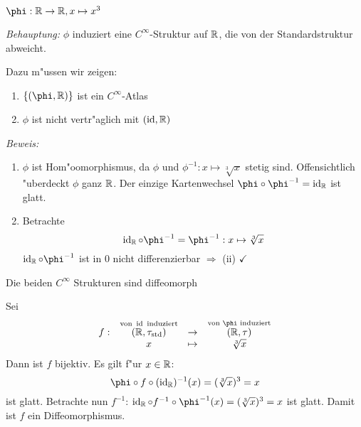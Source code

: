 \begin{Loes}
$\phi: \R \to \R, x \mapsto x^3$

\emph{Behauptung:} $\phi$ induziert eine $C^\infty$-Struktur auf $\operatorname{\mathbb{R}}$, die von der Standardstruktur abweicht.

Dazu m"ussen wir zeigen:\begin{enumerate}[font=\normalfont,label=(\roman*)]
\item
	$\{(\phi, \R)\}$ ist ein $C^\infty$-Atlas
\item
	$\phi$ ist nicht vertr"aglich mit $(\operatorname{id}, \operatorname{\mathbb{R}})$
\end{enumerate}
\emph{Beweis:}\begin{enumerate}[leftmargin=*,widest=ii,font=\normalfont,label=(\roman*)]
\item
	$\phi$ ist Hom"oomorphismus, da $\phi$ und $\phi^{-1}: x \mapsto \sqrt[3]{x}$ stetig sind. Offensichtlich "uberdeckt $\phi$ ganz $\operatorname{\mathbb{R}}$. Der einzige Kartenwechsel $\phi \circ \phi^{-1} = \Id_{\R}$ ist glatt.
\item
	Betrachte
		\[ \Id_{\R} \circ \phi^{-1} = \phi^{-1}: x \mapsto \sqrt[3]{x} \]
	$\Id_{\R} \circ \phi^{-1}$ ist in $0$ nicht differenzierbar $\Rightarrow$ (ii) $\checkmark$
\end{enumerate}
\begin{description}[font=\normalfont\itshape]
\item[Behauptung:]
	Die beiden $C^\infty$ Strukturen sind diffeomorph
\item[Beweis:]
	Sei
		\[\begin{array}{cccc} f:&  \overset{\text{von } \Id \text{ induziert}}{(\R, \tau_{\text{std}})} &\to& \overset{\text{von } \phi \text{ induziert}}{(\R, \tau)} \\
			& x &\mapsto& \sqrt[3]{x} \end{array}\]
	Dann ist $f$ bijektiv. Es gilt f"ur $x \in \operatorname{\mathbb{R}}$:
		\[ \phi \circ f \circ (\Id_{\R})^{-1} (x) = (\sqrt[3]{x})^3 = x \]
	ist glatt. Betrachte nun $f^{-1}$: $\Id_{\R} \circ f^{-1} \circ \phi^{-1}(x) = (\sqrt[3]{x})^3 = x$ ist glatt. Damit ist $f$ ein Diffeomorphismus.
\end{description}
\end{Loes}

